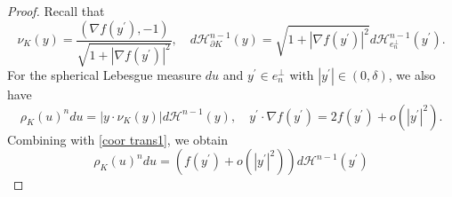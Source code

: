\documentclass[12pt, oneside,reqno]{amsart}
\numberwithin{equation}{section}
\newtheorem{definition and theorem}[theorem]{Definition and Theorem}
\theoremstyle{plain}
\theoremstyle{remark}
\theoremstyle{definition}
\newcommand{\tH}{\mathcal{H}}
\begin{document}
\begin{proof}
    Recall that
    \begin{equation}\label{coor trans1}
        \nu_K(y)=\frac{(\nabla f(y^{\prime}),-1)}{\sqrt{1+|\nabla f(y^{\prime})|^2}},\quad d\tH^{n-1}_{\partial K}(y)=\sqrt{1+|\nabla f(y^{\prime})|^2}d\tH^{n-1}_{e_n^{\perp}}(y^{\prime}).
    \end{equation}
    For the spherical Lebesgue measure $du$ and $y^{\prime}\in e_n^{\perp}$ with $|y^{\prime}|\in(0,\delta)$, we also have
    \begin{equation*}
        \rho_K(u)^ndu=| y\cdot \nu_K(y) |d\tH^{n-1}(y),\quad y^{\prime}\cdot  \nabla f(y^{\prime})=2f(y^{\prime})+o(|y^{\prime}|^2).
    \end{equation*}
    Combining with \eqref{coor trans1}, we obtain
    \begin{equation}\label{coor trans2}
        \rho_K(u)^ndu=(f(y^{\prime})+o(|y^{\prime}|^2))d\tH^{n-1}(y^{\prime})
    \end{equation}


\end{proof}
\end{document}
